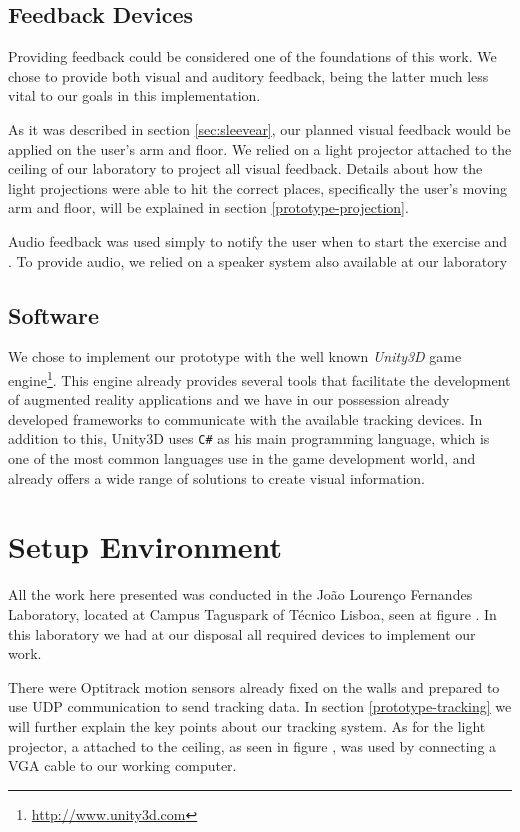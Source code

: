 \subsection{Feedback Devices}

Providing feedback could be considered one of the foundations of this work. 
We chose to provide both visual and auditory feedback, being the latter much less vital to our goals in this implementation.

As it was described in section \ref{sec:sleevear}, our planned visual feedback would be applied on the user's arm and floor.
We relied on a light projector attached to the ceiling of our laboratory to project all visual feedback.
Details about how the light projections were able to hit the correct places, specifically the user's moving arm and floor, will be explained in section \ref{prototype-projection}.

Audio feedback was used simply to notify the user when to start the exercise and .
To provide audio, we relied on a speaker system also available at our laboratory

\subsection{Software}

We chose to implement our prototype with the well known \emph{Unity3D} game engine\footnote{\url{http://www.unity3d.com}}.
This engine already provides several tools that facilitate the development of augmented reality applications and we have in our possession already developed frameworks to communicate with the available tracking devices. In addition to this, Unity3D uses \texttt{C\#} as his main programming language, which is one of the most common languages use in the game development world, and already offers a wide range of solutions to create visual information.

\section{Setup Environment}

All the work here presented was conducted in the Jo\~ao Louren\c{c}o Fernandes Laboratory, located at Campus Taguspark of T\'ecnico Lisboa, seen at figure .
In this laboratory we had at our disposal all required devices to implement our work.

There were  Optitrack motion sensors already fixed on the walls and prepared to use UDP communication to send tracking data. 
In section \ref{prototype-tracking} we will further explain the key points about our tracking system.
As for the light projector, a  attached to the ceiling, as seen in figure , 
was used by connecting a VGA cable to our working computer.

